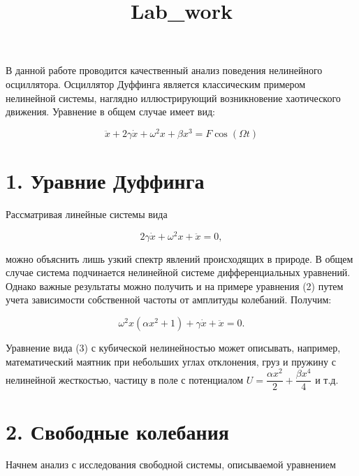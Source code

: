 \documentclass[11pt]{article}
\title{Lab\_work}
\begin{document}
    
    \maketitle
    
    

    
    В данной работе проводится качественный анализ поведения нелинейного
осциллятора. Осциллятор Дуффинга является классическим примером
нелинейной системы, наглядно иллюстрирующий возникновение хаотического
движения. Уравнение в общем случае имеет вид:

\begin{equation}
\ddot{x} + 2 \gamma \dot{x} + \omega^2 x + \beta x^3 = F \cos(\Omega t)
\end{equation}

\hypertarget{ux443ux440ux430ux432ux43dux438ux435-ux434ux443ux444ux444ux438ux43dux433ux430}{%
\section{1. Уравние
Дуффинга}\label{ux443ux440ux430ux432ux43dux438ux435-ux434ux443ux444ux444ux438ux43dux433ux430}}

Рассматривая линейные системы вида

\[ 2 \gamma  \dot{x}+ \omega^2 x  +\ddot{x}=0,\]

можно объяснить лишь узкий спектр явлений происходящих в природе. В
общем случае система подчинается нелинейной системе дифференциальных
уравнений. Однако важные результаты можно получить и на примере
уравнения (2) путем учета зависимости собственной частоты от амплитуды
колебаний. Получим:

\[\omega^2 x \left(\alpha x^2+1\right)+ \gamma \dot{x}+\ddot{x}=0.\]

Уравнение вида (3) с кубической нелинейностью может описывать, например,
математический маятник при небольших углах отклонения, груз и пружину с
нелинейной жесткостью, частицу в поле с потенциалом
\(U=\dfrac{\alpha x^2}{2}+\dfrac{\beta x^4}{4}\) и т.д.

\hypertarget{ux441ux432ux43eux431ux43eux434ux43dux44bux435-ux43aux43eux43bux435ux431ux430ux43dux438ux44f}{%
\section{2. Свободные
колебания}\label{ux441ux432ux43eux431ux43eux434ux43dux44bux435-ux43aux43eux43bux435ux431ux430ux43dux438ux44f}}

Начнем анализ с исследования свободной системы, описываемой уравнением
\end{document}
